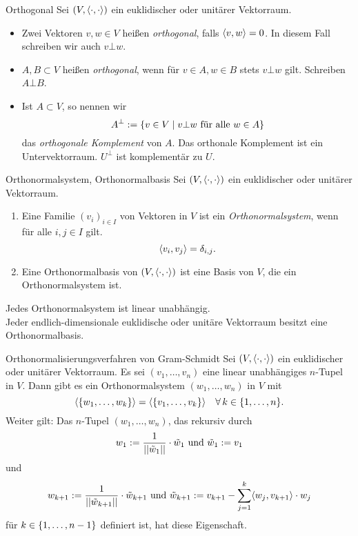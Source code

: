 \documentclass[main.tex]{subfiles}
\begin{document}
\begin{karte}{Orthogonal}
    Sei \( (V, \langle \cdot, \cdot \rangle) \) ein 
    euklidischer oder unitärer Vektorraum. 
    \begin{itemize}
        \item Zwei Vektoren \(v,w\in V\) heißen 
        \textit{orthogonal}, falls 
        \( \langle v, w \rangle = 0 \). In diesem Fall 
        schreiben wir auch \(v\bot w\).
        \item \( A, B \subset V \) heißen \textit{orthogonal}, 
        wenn für \( v\in A, w\in B \) stets \(v\bot w\) gilt.
        Schreiben \(A\bot B\).
        \item Ist \( A\subset V \), so nennen wir 
        \[ A^\bot := \{ v\in V \;\vert\; v\bot w \text{ für alle } w\in A \} \]
        das \textit{orthogonale Komplement} von \(A\). Das orthonale 
        Komplement ist ein Untervektorraum. \( U^\bot \) ist 
        komplementär zu \(U\).
    \end{itemize}
\end{karte}

\begin{karte}{Orthonormalsystem, Orthonormalbasis}
    Sei \( (V, \langle \cdot, \cdot \rangle) \) ein 
    euklidischer oder unitärer Vektorraum. 
    \begin{enumerate}
        \item Eine Familie \( (v_i)_{i\in I} \) 
        von Vektoren in \(V\) ist ein 
        \textit{Orthonormalsystem}, wenn für alle 
        \( i,j \in I \) gilt.
        \[ \langle v_i, v_j \rangle = \delta_{i,j}. \]
        \item Eine Orthonormalbasis von 
        \( (V, \langle \cdot, \cdot \rangle) \) ist 
        eine Basis von \(V\), die ein Orthonormalsystem ist.
    \end{enumerate}
    Jedes Orthonormalsystem ist linear unabhängig.\\
    Jeder endlich-dimensionale euklidische oder 
    unitäre Vektorraum besitzt eine Orthonormalbasis.
\end{karte}

\begin{karte}{Orthonormalisierungsverfahren von Gram-Schmidt}
   Sei \( (V, \langle \cdot, \cdot \rangle) \) ein 
   euklidischer oder unitärer Vektorraum. Es sei 
   \( (v_1,\ldots, v_n) \) eine linear unabhängiges 
   \(n\)-Tupel in \(V\). Dann gibt es ein 
   Orthonormalsystem \( (w_1, \ldots, w_n) \) in \(V\) 
   mit 
   \[ \langle \set{w_1, \ldots, w_k} \rangle 
   = \langle \set{ v_1, \ldots, v_k } \rangle \quad 
   \forall k \in \set{1,\ldots, n}. \]
   Weiter gilt: Das \(n\)-Tupel 
   \( (w_1, \ldots, w_n) \), das rekursiv durch 
   \[ w_1 := \frac{1}{\left|\left|\tilde{w}_1\right|\right|} \cdot \tilde{w}_1 
   \text{ und } \tilde{w}_1 := v_1 \]
   und 
   \[ w_{k+1} := \frac{1}{\left|\left| \tilde{w}_{k+1} \right|\right|} 
   \cdot \tilde{w}_{k+1} \text{ und } 
   \tilde{w}_{k+1} := 
   v_{k+1} - \sum_{j=1}^k \langle w_j, v_{k+1} \rangle \cdot w_j \]
   für \( k\in \{1, \ldots, n-1\} \) definiert ist, hat 
   diese Eigenschaft.
\end{karte}
\end{document}
